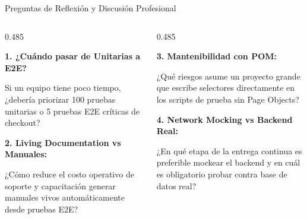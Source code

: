 \documentclass[aspectratio=169]{beamer}
\begin{document}
\begin{frame}{Preguntas de Reflexión y Discusión Profesional}
  \begin{columns}[T,onlytextwidth]
    \begin{column}{0.485\textwidth}
      \begin{tcolorbox}[colback=cbWhite,colframe=cbBlue,arc=4pt,title=\textbf{Gobernanza y Estrategia},coltitle=cbWhite,fonttitle=\scriptsize\bfseries]
        {\scriptsize
        \textbf{1. ¿Cuándo pasar de Unitarias a E2E?}\par
        Si un equipo tiene poco tiempo, ¿debería priorizar 100 pruebas unitarias o 5 pruebas E2E críticas de checkout?\par\vspace{0.15cm}
        \textbf{2. Living Documentation vs Manuales:}\par
        ¿Cómo reduce el costo operativo de soporte y capacitación generar manuales vivos automáticamente desde pruebas E2E?\par
        }
      \end{tcolorbox}
    \end{column}
    \begin{column}{0.485\textwidth}
      \begin{tcolorbox}[colback=cbWhite,colframe=cbPurple,arc=4pt,title=\textbf{Arquitectura y Mantenibilidad},coltitle=cbWhite,fonttitle=\scriptsize\bfseries]
        {\scriptsize
        \textbf{3. Mantenibilidad con POM:}\par
        ¿Qué riesgos asume un proyecto grande que escribe selectores directamente en los scripts de prueba sin Page Objects?\par\vspace{0.15cm}
        \textbf{4. Network Mocking vs Backend Real:}\par
        ¿En qué etapa de la entrega continua es preferible mockear el backend y en cuál es obligatorio probar contra base de datos real?\par
        }
      \end{tcolorbox}
    \end{column}
  \end{columns}
\end{frame}
\end{document}
